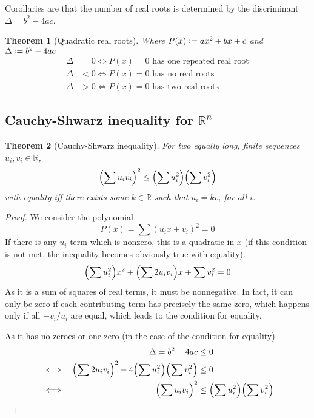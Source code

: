\documentclass[fleqn,a4paper,11pt]{article}
\newcommand{\defeq}{\vcentcolon=}
\newcommand{\setstyle}{\mathbb}
\newcommand{\Reals}{\setstyle R}
\newtheorem{theorem}{Theorem}[section]
\begin{document}
    Corollaries are that the number of real roots is determined by the
    discriminant \({\Delta = b^2 - 4ac}\).
    \begin{theorem}[Quadratic real roots]
    Where \(P(x) \defeq ax^2 + bx + c\) and \(\Delta \defeq b^2 - 4ac\)
    \begin{align*}
    \Delta &= 0 \iff \text{\(P(x) = 0\) has one repeated real root} \\
    \Delta &< 0 \iff \text{\(P(x) = 0\) has no real roots} \\
    \Delta &> 0 \iff \text{\(P(x) = 0\) has two real roots}
    \end{align*}
    \end{theorem}

    \subsection[Cauchy-Shwarz inequality for \(\Reals^n\)]
               {Cauchy-Shwarz inequality for \boldmath\(\Reals^n\)}

    \begin{theorem}[Cauchy-Shwarz inequality]
    For two equally long, finite sequences \(u_i, v_i \in \Reals\),
    \begin{equation*}
    \pqty{\sum u_i v_i}^2 \le \pqty{\sum u_i^2} \pqty{\sum v_i^2}
    \end{equation*}
    with equality iff there exists some \(k \in \Reals\) such that
    \(u_i = k v_i\) for all \(i\).
    \end{theorem}
    \begin{proof}
    We consider the polynomial
    \begin{equation*}
    P(x) = \sum (u_i x + v_i)^2 = 0
    \end{equation*}
    If there is any \(u_i\) term which is nonzero, this is a quadratic in \(x\)
    (if this condition is not met, the inequality becomes obviously true with
    equality).
    \begin{equation*}
    \pqty{\sum u_i^2} x^2 + \pqty{\sum 2 u_i v_i} x + \sum v_i^2 = 0
    \end{equation*}
    As it is a sum of squares of real terms, it must be nonnegative. In fact, it
    can only be zero if each contributing term has precisely the same zero,
    which happens only if all \(-v_i/u_i\) are equal, which leads to the
    condition for equality.

    As it has no zeroes or one zero (in the case of the condition for equality)
    \begin{alignat*}{2}
    &&\Delta = b^2 - 4ac &\le 0 \\
    &\iff&
    \pqty{\sum 2 u_i v_i}^2 - 4\pqty{\sum u_i^2}\pqty{\sum v_i^2} &\le 0 \\
    &\iff& \pqty{\sum u_i v_i}^2 &\le \pqty{\sum u_i^2} \pqty{\sum v_i^2}
    \end{alignat*}
    \end{proof}
\end{document}
